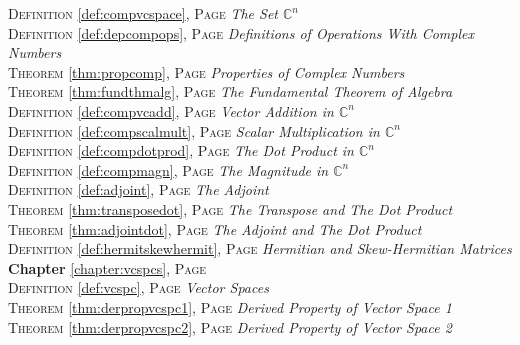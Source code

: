 \begin{multicols}{2}
{         \textsc{Definition} \ref{def:compvcspace}, \textsc{Page} \pageref{def:compvcspace} \textit{The Set \(\mathbb {C}^n\)} \\
         \textsc{Definition} \ref{def:depcompops}, \textsc{Page} \pageref{def:depcompops} \textit{Definitions of Operations With Complex Numbers} \\
         \textsc{Theorem} \ref{thm:propcomp}, \textsc{Page} \pageref{thm:propcomp} \textit{Properties of Complex Numbers} \\
         \textsc{Theorem} \ref{thm:fundthmalg}, \textsc{Page} \pageref{thm:fundthmalg} \textit{The Fundamental Theorem of Algebra} \\
         \textsc{Definition} \ref{def:compvcadd}, \textsc{Page} \pageref{def:compvcadd} \textit{Vector Addition in \(\mathbb {C}^n\)} \\
         \textsc{Definition} \ref{def:compscalmult}, \textsc{Page} \pageref{def:compscalmult} \textit{Scalar Multiplication in \(\mathbb {C}^n\)} \\
         \textsc{Definition} \ref{def:compdotprod}, \textsc{Page} \pageref{def:compdotprod} \textit{The Dot Product in \(\mathbb {C}^n\)} \\
         \textsc{Definition} \ref{def:compmagn}, \textsc{Page} \pageref{def:compmagn} \textit{The Magnitude in \(\mathbb {C}^n\)} \\
         \textsc{Definition} \ref{def:adjoint}, \textsc{Page} \pageref{def:adjoint} \textit{The Adjoint} \\
         \textsc{Theorem} \ref{thm:transposedot}, \textsc{Page} \pageref{thm:transposedot} \textit{The Transpose and The Dot Product} \\
         \textsc{Theorem} \ref{thm:adjointdot}, \textsc{Page} \pageref{thm:adjointdot} \textit{The Adjoint and The Dot Product} \\
         \textsc{Definition} \ref{def:hermitskewhermit}, \textsc{Page} \pageref{def:hermitskewhermit} \textit{Hermitian and Skew-Hermitian Matrices} \\
         \textbf{Chapter} \ref{chapter:vcspcs}, \textsc{Page} \pageref{chapter:vcspcs} \\
         \textsc{Definition} \ref{def:vcspc}, \textsc{Page} \pageref{def:vcspc} \textit{Vector Spaces} \\
         \textsc{Theorem} \ref{thm:derpropvcspc1}, \textsc{Page} \pageref{thm:derpropvcspc1} \textit{Derived Property of Vector Space 1} \\
         \textsc{Theorem} \ref{thm:derpropvcspc2}, \textsc{Page} \pageref{thm:derpropvcspc2} \textit{Derived Property of Vector Space 2} \\
}
\end{multicols}
